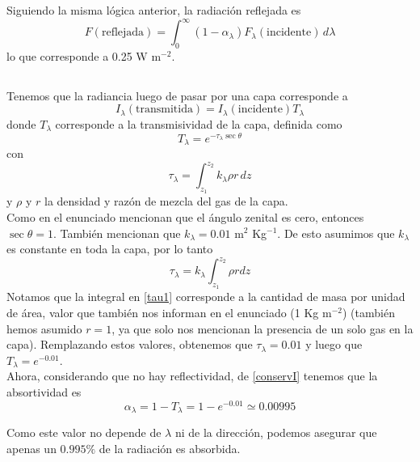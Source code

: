 \documentclass{tarea}
\begin{document}
Siguiendo la misma lógica anterior, la radiación reflejada es
\begin{equation}
   F (\text{reflejada}) = \int_0^{\infty} (1 - \alpha_\lambda) F_\lambda (\text{incidente}) \, d\lambda \nonumber
\end{equation}
lo que corresponde a 0.25 W m$^{-2}$.


\setcounter{subsection}{42}
\subsection{}

Tenemos que la radiancia luego de pasar por una capa corresponde a
\begin{equation}
    I_\lambda (\text{transmitida}) = I_\lambda (\text{incidente}) T_\lambda \nonumber
\end{equation}
donde $T_\lambda$ corresponde a la transmisividad de la capa, definida como
 $$T_\lambda = e^{-\tau_\lambda \sec\theta}$$
con $$\tau_\lambda = \int_{z_1}^{z_2} k_\lambda \rho r \, dz$$
y $\rho$ y $r$ la densidad y razón de mezcla del gas de la capa.\\

Como en el enunciado mencionan que el ángulo zenital es cero, entonces $\sec\theta = 1$. También mencionan que $k_\lambda = 0.01$ m$^{2}$ Kg$^{-1}$. De esto asumimos que $k_\lambda$ es constante en toda la capa, por lo tanto
\begin{equation}
    \tau_\lambda = k_\lambda \int_{z_1}^{z_2} \rho r dz \label{tau1}
\end{equation}
Notamos que la integral en \eqref{tau1} corresponde a la cantidad de masa por unidad de área, valor que también nos informan en el enunciado (1 Kg m$^{-2}$) (también hemos asumido $r=1$, ya que solo nos mencionan la presencia de un solo gas en la capa). Remplazando estos valores, obtenemos que $\tau_\lambda = 0.01$ y luego que $T_\lambda = e^{-0.01}$.\\

Ahora, considerando que no hay reflectividad, de \eqref{conservI} tenemos que la absortividad es
$$\alpha_\lambda = 1 - T_\lambda = 1 - e^{-0.01} \simeq 0.00995$$

Como este valor no depende de $\lambda$ ni de la dirección, podemos asegurar que apenas un $0.995 \%$ de la radiación es absorbida.\\
\end{document}
